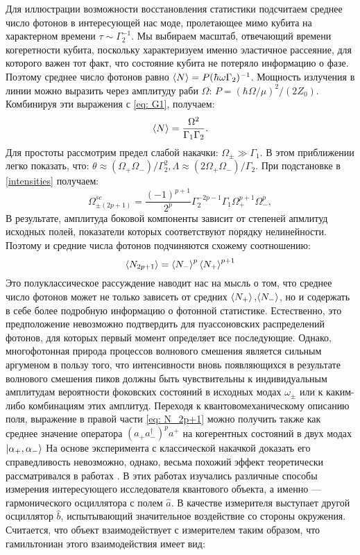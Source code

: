 Для иллюстрации возможности восстановления статистики подсчитаем среднее число фотонов в интересующей нас моде, пролетающее мимо кубита на характерном времени $\tau\sim\Gamma_2^{-1}$. Мы выбираем масштаб, отвечающий времени когеретности кубита, поскольку характеризуем именно эластичное рассеяние, для которого важен тот факт, что состояние кубита не потеряло информацию о фазе. Поэтому среднее число фотонов равно $\braket{N} = P(\hbar\omega\Gamma_2)^{-1}$. Мощность излучения в линии можно выразить через амплитуду раби $\Omega$: $P = (\hbar\Omega/\mu)^2/(2Z_0)$. Комбинируя эти выражения с \eqref{eq: G1}, получаем:
\begin{equation} \label{eq: av_photons}
	\braket{N} = \frac{\Omega^2}{\Gamma_1\Gamma_2}.
\end{equation}
Для простоты рассмотрим предел слабой накачки: $\Omega_{\pm} \gg \Gamma_1.$ В этом приближении легко показать, что:
$\theta \approx (\Omega_+\Omega_-)/\Gamma_2^2, \Lambda \approx (2\Omega_+\Omega_-)/{\Gamma_2}
$. При подстановке в \eqref{intensities} получаем:
\begin{equation}\label{eq: 2p+1_approx}
	\Omega_{\pm(2p+1)}^{sc} =\frac{(-1)^{p+1}}{2^{p}}\Gamma_2^{-2p-1}\Gamma_1\Omega_+^{p+1}\Omega_-^p,
\end{equation}
В результате, амплитуда боковой компоненты зависит от степеней апмлитуд исходных полей, показатели которых соответствуют порядку нелинейности. Поэтому и средние числа фотонов подчиняются схожему соотношению:
\begin{equation}\label{eq: N_2p+1}
	\braket{N_{2p+1}} = \braket{N_-}^p\braket{N_+}^{p+1}
\end{equation}
Это полуклассическое рассуждение наводит нас на мысль о том, что среднее число фотонов может не только зависеть от средних $\braket{N_+},\!\braket{N_-}$, но и содержать в себе более подробную информацию о фотонной статистике. Естественно, это предположение невозможно подтвердить для пуассоновских распределений фотонов, для которых первый момент определяет все последующие. Однако, многофотонная природа процессов волнового смешения является сильным аргуменом в пользу того, что интенсивности вновь появляющихся в результате волнового смешения пиков должны быть чувствительны к индивидуальным амплитудам вероятности фоковских состояний в исходных модах $\omega_\pm$ или к каким-либо комбинациям этих амплитуд. Переходя к квантовомеханическому описанию поля, выражение в правой части \eqref{eq: N_2p+1} можно получить также как среднее значение оператора $(a_+a_-^\dag)^pa^+$ на когерентных состояний в двух модах $\ket{\alpha_+, \alpha_-}$ На основе эксперимента с классической накачкой доказать его справедливость невозможно, однако, весьма похожий эффект теоретически рассматривался в работах \cite{WallsMilburn_PRD,PhysRevA.28.2646}. В этих работах изучались различные способы измерения интересующего исследователя квантового объекта, а именно --- гармонического осциллятора с полем $\hat{a}$. В качестве измерителя выступает другой осциллятор $\hat{b}$, испытывающий значительное воздействие со стороны окружения. Считается, что объект взаимодействует с измерителем таким образом, что гамильтониан этого взаимодействия имеет вид:
